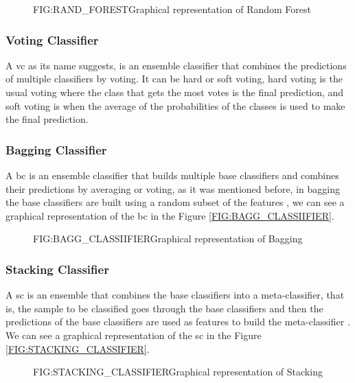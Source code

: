 \begin{figure}[Random Forest]{FIG:RAND_FOREST}{Graphical representation of Random Forest \cite{hemashreekilari_understanding_2023-2}}
\end{figure}

\subsubsection{Voting Classifier}
A \ac{vc} as its name suggests, is an ensemble classifier that combines the predictions of multiple classifiers by voting. It can be hard or soft voting, hard voting is the usual voting where the class that gets the most votes is the final prediction, and soft voting is when the average of the probabilities of the classes is used to make the final prediction.

\subsubsection{Bagging Classifier}
A \ac{bc} is an ensemble classifier that builds multiple base classifiers and combines their predictions by averaging or voting, as it was mentioned before, in bagging the base classifiers are built using a random subset of the features \cite{scikit_learn_bagging_nodate}, we can see a graphical representation of the \ac{bc} in the Figure \ref{FIG:BAGG_CLASSIIFIER}.


\begin{figure}[Bagging Classifier]{FIG:BAGG_CLASSIIFIER}{Graphical representation of Bagging \cite{hemashreekilari_understanding_2023}}
\end{figure}

\subsubsection{Stacking Classifier}
A \ac{sc} is an ensemble that combines the base classifiers into a meta-classifier, that is, the sample to be classified goes through the base classifiers and then the predictions of the base classifiers are used as features to build the meta-classifier \cite{wolpert_stacked_nodate}. We can see a graphical representation of the \ac{sc} in the Figure \ref{FIG:STACKING_CLASSIFIER}.

\begin{figure}[Stacking Classifier]{FIG:STACKING_CLASSIFIER}{Graphical representation of Stacking \cite{ceballos_stacking_2019}}
\end{figure}